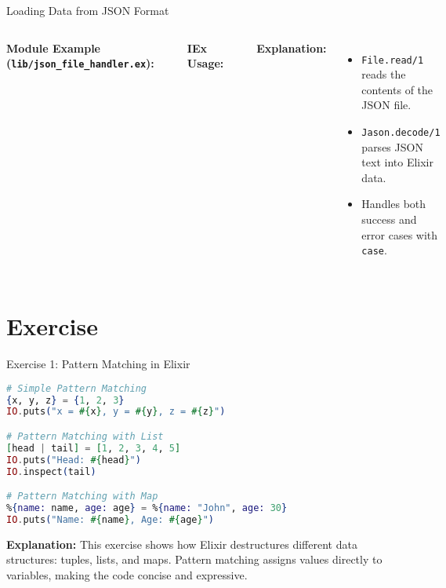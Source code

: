 \documentclass[aspectratio=169, table]{beamer}
\begin{document}
\begin{frame}[fragile]{Loading Data from JSON Format}
\vspace{20pt}
\begin{columns}[t]

\textbf{Module Example (\texttt{lib/json\_file\_handler.ex}):}
\begin{lstlisting}[language=Elixir, basicstyle=\ttfamily\scriptsize]
defmodule Json_File_Handler do
  # Load data from a JSON file
  def load_json(filename) do
    case File.read(filename) do
      {:ok, content} ->
        case Jason.decode(content) do
          {:ok, decoded_data} ->
            IO.inspect(decoded_data)
          {:error, reason} ->
            IO.puts("Failed to decode JSON: #{reason}")
        end
      {:error, reason} ->
        IO.puts("Failed to read file: #{reason}")
    end
  end
end
\end{lstlisting}

\textbf{IEx Usage:}
\begin{lstlisting}[language=Elixir, basicstyle=\ttfamily\scriptsize]
Json_File_Handler.load_json("data.json")
\end{lstlisting}
\textbf{Explanation:}
\begin{itemize}
  \item \texttt{File.read/1} reads the contents of the JSON file.
  \item \texttt{Jason.decode/1} parses JSON text into Elixir data.
  \item Handles both success and error cases with \texttt{case}.
\end{itemize}

\end{columns}
\end{frame}


\section{Exercise}
\begin{frame}[fragile]{Exercise 1: Pattern Matching in Elixir}
\vspace{20pt}

\begin{lstlisting}[language=Elixir, basicstyle=\ttfamily\footnotesize]
# Simple Pattern Matching
{x, y, z} = {1, 2, 3}
IO.puts("x = #{x}, y = #{y}, z = #{z}")

# Pattern Matching with List
[head | tail] = [1, 2, 3, 4, 5]
IO.puts("Head: #{head}")
IO.inspect(tail)

# Pattern Matching with Map
%{name: name, age: age} = %{name: "John", age: 30}
IO.puts("Name: #{name}, Age: #{age}")
\end{lstlisting}

\textbf{Explanation:}  
This exercise shows how Elixir destructures different data structures:  
tuples, lists, and maps. Pattern matching assigns values directly to variables,  
making the code concise and expressive.
\end{frame}
\end{document}
